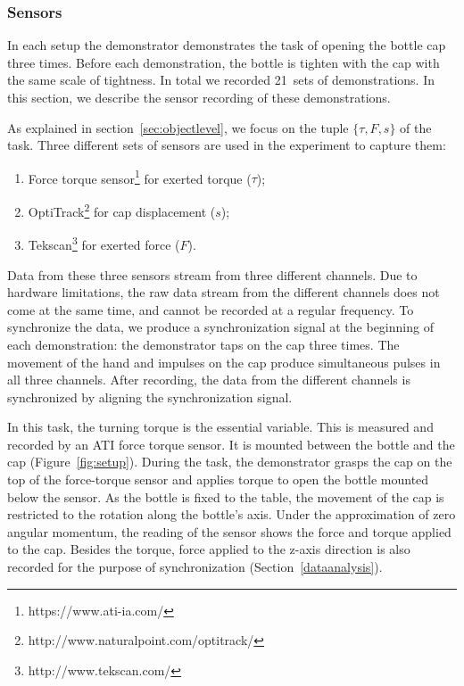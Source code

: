 \subsubsection{Sensors}
\label{sec:sensor}
In each setup the demonstrator demonstrates the task of opening the bottle
cap three times. Before each demonstration, the bottle is tighten with
the cap with the same scale of tightness. In total we recorded 21~sets
of demonstrations. In this section, we describe the sensor recording of these
demonstrations.


As explained in section~\ref{sec:objectlevel}, we focus on the tuple
$\{\tau,F,s\}$ of the task. Three different sets of sensors are used in
the experiment to capture them:

\begin{enumerate}
\item Force torque sensor\footnote{https://www.ati-ia.com/} for exerted torque ($\tau$);
\item OptiTrack\footnote{http://www.naturalpoint.com/optitrack/} for cap displacement ($s$);
\item Tekscan\footnote{http://www.tekscan.com/} for exerted force ($F$).
\end{enumerate}

Data from these three sensors stream from three different
channels. Due to hardware limitations, the raw data stream from the
different channels does not come at the same time, and cannot be
recorded at a regular frequency. To synchronize the data, we produce a
synchronization signal at the beginning of each demonstration: the
demonstrator taps on the cap three times. The movement of the hand and
impulses on the cap produce simultaneous pulses in all three
channels. After recording, the data from the different channels is
synchronized by aligning the synchronization signal.


In this task, the turning torque is the essential variable. This is
measured and recorded by an ATI force torque sensor. It is mounted
between the bottle and the cap (Figure~\ref{fig:setup}). During the
task, the demonstrator grasps the cap on the top of the force-torque
sensor and applies torque to open the bottle mounted below the
sensor. As the bottle is fixed to the table, the movement of the cap
is restricted to the rotation along the bottle's axis. Under the
approximation of zero angular momentum, the reading of the sensor
shows the force and torque applied to the cap. Besides the torque,
force applied to the z-axis direction is also recorded for the purpose
of synchronization (Section~\ref{dataanalysis}).

